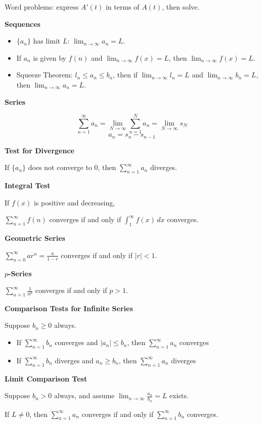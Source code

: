 \documentclass[10pt]{article}
\newcommand\sectionheading[1]{\begin{center}\large{\textbf{#1}}\end{center}\normalsize}
\newcommand\heading[1]{\smallskip\textbf{#1}\smallskip}
\begin{document}
\begin{multicols*}{3}
Word problems: express $A'(t)$ in terms of $A(t)$, then solve.

\sectionheading{Sequences}
\begin{itemize}[noitemsep,topsep=0pt]
    \item $\{a_n\}$ has limit $L$: $\lim_{n\to\infty}a_n=L$.
    \item If $a_n$ is given by $f(n)$ and $\lim_{n\to\infty}f(x)=L$, then $\lim_{n\to\infty} f(x)=L$.
    \item Squeeze Theorem: $l_n\leq a_n\leq b_n$, then if $\lim_{n\to\infty}l_n=L$ and $\lim_{n\to\infty}b_n=L$, then $\lim_{n\to\infty}a_n=L$.
\end{itemize}

\sectionheading{Series}
\[\sum_{n=1}^{\infty}a_n=\lim_{N\to\infty}\sum_{n=1}^{N}a_n=\lim_{N\to\infty}s_N\]
\[a_n=s_n-s_{n-1}\]

\heading{Test for Divergence}

If $\{a_n\}$ does not converge to $0$, then $\sum_{n=1}^{\infty}a_n$ diverges.

\heading{Integral Test}

If $f(x)$ is positive and decreasing,

$\displaystyle\sum_{n=1}^{\infty}f(n)$ converges if and only if $\displaystyle\int_{1}^{\infty}f(x)\,dx$ converges.

\heading{Geometric Series}

$\displaystyle\sum_{n=0}^{\infty}ar^n=\frac{a}{1-r}$ converges if and only if $|r|<1$.

\heading{$p$-Series}

$\displaystyle\sum_{n=1}^{\infty}\frac{1}{n^p}$ converges if and only if $p>1$.

\heading{Comparison Tests for Infinite Series}

Suppose $b_n\geq 0$ always.
\begin{itemize}[noitemsep,topsep=0pt]
    \item If $\sum_{n=1}^\infty b_n$ converges and $|a_n|\leq b_n$, then $\sum_{n=1}^\infty a_n$ converges 
    \item If $\sum_{n=1}^\infty b_n$ diverges and $a_n\geq b_n$, then $\sum_{n=1}^\infty a_n$ diverges 
\end{itemize}

\heading{Limit Comparison Test}

Suppose $b_n > 0$ always, and assume $\displaystyle\lim_{n\to\infty}\frac{a_n}{b_n}=L$ exists.

If $L\neq 0$, then $\displaystyle\sum_{n=1}^\infty a_n$ converges if and only if $\displaystyle\sum_{n=1}^\infty b_n$ converges.


\end{multicols*}
\end{document}
